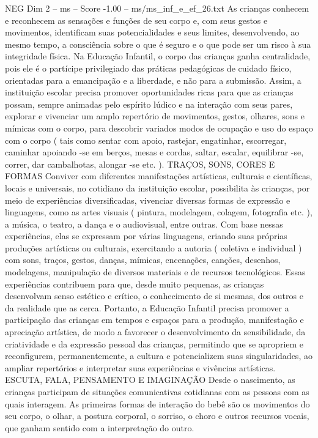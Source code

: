 \begin{textsample}{NEG Dim 2 – ms – Score -1.00 – ms/ms\_inf\_e\_ef\_26.txt}
As crianças conhecem e reconhecem as sensações e funções de seu corpo e, com seus gestos e movimentos, identificam suas potencialidades e seus limites, desenvolvendo, ao mesmo tempo, a consciência sobre o que é seguro e o que pode ser um risco à sua integridade física.
Na Educação Infantil, o corpo das crianças ganha centralidade, pois ele é o partícipe privilegiado das práticas pedagógicas de cuidado físico, orientadas para a emancipação e a liberdade, e não para a submissão.
Assim, a instituição escolar precisa promover oportunidades ricas para que as crianças possam, sempre animadas pelo espírito lúdico e na interação com seus pares, explorar e vivenciar um amplo repertório de movimentos, gestos, olhares, sons e mímicas com o corpo, para descobrir variados modos de ocupação e uso do espaço com o corpo ( tais como sentar com apoio, rastejar, engatinhar, escorregar, caminhar apoiando -se em berços, mesas e cordas, saltar, escalar, equilibrar -se, correr, dar cambalhotas, alongar -se etc. ).
TRAÇOS, SONS, CORES E FORMAS Conviver com diferentes manifestações artísticas, culturais e científicas, locais e universais, no cotidiano da instituição escolar, possibilita às crianças, por meio de experiências diversificadas, vivenciar diversas formas de expressão e linguagens, como as artes visuais ( pintura, modelagem, colagem, fotografia etc. ), a música, o teatro, a dança e o audiovisual, entre outras.
Com base nessas experiências, elas se expressam por várias linguagens, criando suas próprias produções artísticas ou culturais, exercitando a autoria ( coletiva e individual ) com sons, traços, gestos, danças, mímicas, encenações, canções, desenhos, modelagens, manipulação de diversos materiais e de recursos tecnológicos.
Essas experiências contribuem para que, desde muito pequenas, as crianças desenvolvam senso estético e crítico, o conhecimento de si mesmas, dos outros e da realidade que as cerca.
Portanto, a Educação Infantil precisa promover a participação das crianças em tempos e espaços para a produção, manifestação e apreciação artística, de modo a favorecer o desenvolvimento da sensibilidade, da criatividade e da expressão pessoal das crianças, permitindo que se apropriem e reconfigurem, permanentemente, a cultura e potencializem suas singularidades, ao ampliar repertórios e interpretar suas experiências e vivências artísticas.
ESCUTA, FALA, PENSAMENTO E IMAGINAÇÃO Desde o nascimento, as crianças participam de situações comunicativas cotidianas com as pessoas com as quais interagem.
As primeiras formas de interação do bebê são os movimentos do seu corpo, o olhar, a postura corporal, o sorriso, o choro e outros recursos vocais, que ganham sentido com a interpretação do outro.

\end{textsample}
